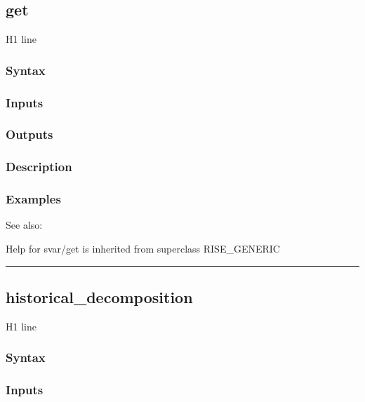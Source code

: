\documentclass[letterpaper,10pt,english]{sphinxmanual}
\begin{document}
\subsection{get}
\label{classes/models/@svar/svar:id20}\label{classes/models/@svar/svar:get}
H1 line


\subsubsection{Syntax}
\label{classes/models/@svar/svar:id21}

\subsubsection{Inputs}
\label{classes/models/@svar/svar:id22}

\subsubsection{Outputs}
\label{classes/models/@svar/svar:id23}

\subsubsection{Description}
\label{classes/models/@svar/svar:id24}

\subsubsection{Examples}
\label{classes/models/@svar/svar:id25}
See also:

Help for svar/get is inherited from superclass RISE\_GENERIC


\bigskip\hrule{}\bigskip



\subsection{historical\_decomposition}
\label{classes/models/@svar/svar:historical-decomposition}\label{classes/models/@svar/svar:id26}
H1 line


\subsubsection{Syntax}
\label{classes/models/@svar/svar:id27}

\subsubsection{Inputs}
\label{classes/models/@svar/svar:id28}
\end{document}
